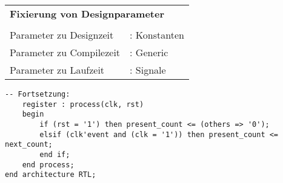 \begin{minipage}{0.01\textwidth}
	\text{ } %
\end{minipage}
\begin{minipage}{0.38\textwidth}
	\begin{tabular}{l l}
		\multicolumn{2}{l}{\textbf{Fixierung von Designparameter}}  \\
		& \\
		Parameter zu Designzeit		& : Konstanten \\
		Parameter zu Compilezeit	& : Generic \\
		Parameter zu Laufzeit		& : Signale \\
	\end{tabular}
\end{minipage}
\begin{minipage}{0.02\textwidth}
	\text{ } %
\end{minipage}
\begin{minipage}{0.58\textwidth}


	\begin{lstlisting}[firstnumber=last]
-- Fortsetzung:
	register : process(clk, rst)
	begin 
		if (rst = '1') then present_count <= (others => '0');
		elsif (clk'event and (clk = '1')) then present_count <= next_count;
		end if;
	end process;
end architecture RTL;
\end{lstlisting}
\end{minipage}
